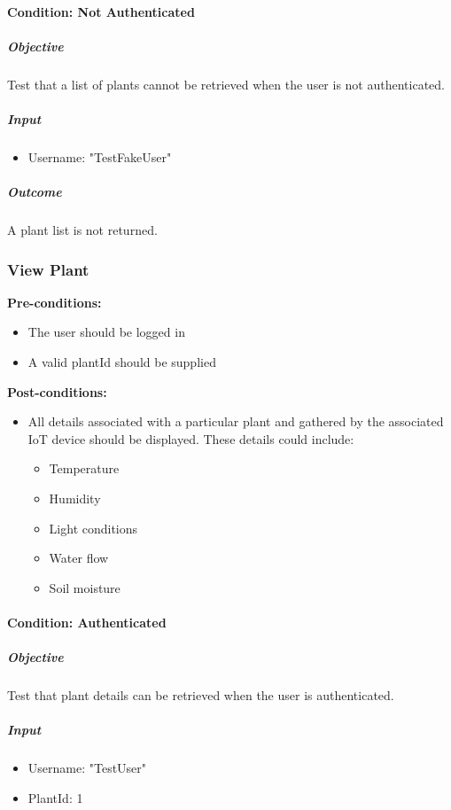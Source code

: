 \documentclass{article}
\begin{document}
		\paragraph{Condition: Not Authenticated}
		\subparagraph{Objective}
		Test that a list of plants cannot be retrieved when the user is not authenticated.
		\subparagraph{Input}
		\begin{itemize}
			\item Username: "TestFakeUser"
		\end{itemize}
		
		\subparagraph{Outcome}
		A plant list is not returned.
		
		\subsubsection{View Plant}
		
		\textbf{Pre-conditions:}
		\begin{itemize}
			\item The user should be logged in
			\item A valid plantId should be supplied
		\end{itemize}
		\textbf{Post-conditions:}
		\begin{itemize}
			\item All details associated with a particular plant and gathered by the associated IoT device should be displayed. These details could include:
			\begin{itemize}
				\item Temperature
				\item Humidity
				\item Light conditions
				\item Water flow
				\item Soil moisture
			\end{itemize}
		\end{itemize}
		
		\paragraph{Condition: Authenticated}
		\subparagraph{Objective}
		Test that plant details can be retrieved when the user is authenticated.
		\subparagraph{Input}
		\begin{itemize}
			\item Username: "TestUser"
			\item PlantId: 1
		\end{itemize}
		
\end{document}
